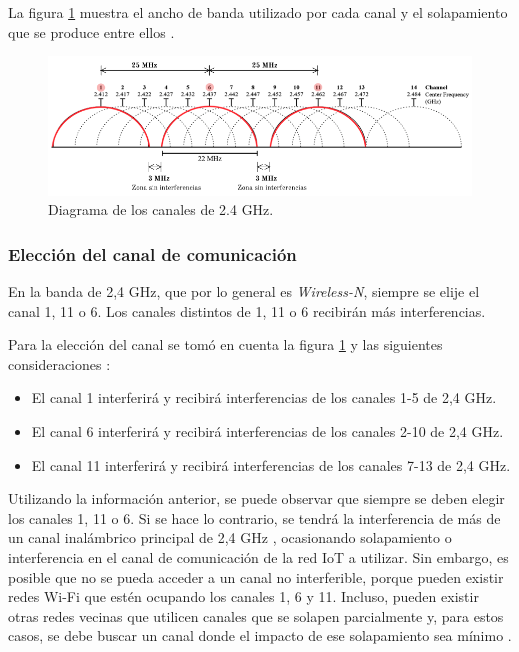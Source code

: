 La figura \ref{fig:canales} muestra el ancho de banda utilizado por cada canal y el solapamiento que se produce entre ellos \citep{WEBSITE:27}.

\begin{figure}[htpb]
\centering 
\includegraphics[width=1.0\textwidth]{./Figures/canales.png}
\caption{Diagrama de los canales de 2.4 GHz.}
\label{fig:canales}
\end{figure}

\subsubsection{Elección del canal de comunicación}
En la banda de 2,4 GHz, que por lo general es \emph{Wireless-N}, siempre se elije el canal 1, 11 o 6. Los canales distintos de 1, 11 o 6 recibirán más interferencias. 

Para la elección del canal se tomó en cuenta la figura  \ref{fig:canales} y las siguientes consideraciones \citep{WEBSITE:28}:

\begin{itemize}
\item El canal 1 interferirá y recibirá interferencias de los canales 1-5 de  2,4 GHz.
\item El canal 6 interferirá y recibirá interferencias de los canales 2-10 de  2,4 GHz.
\item El canal 11 interferirá y recibirá interferencias de los canales 7-13 de 2,4 GHz.
\end{itemize}

Utilizando la información anterior, se puede observar que siempre se deben elegir los canales 1, 11 o 6. Si se hace lo contrario, se tendrá la interferencia de más de un canal inalámbrico principal de 2,4 GHz \citep{WEBSITE:28}, ocasionando solapamiento o interferencia en el canal de comunicación de la red IoT a utilizar. Sin embargo, es posible que no se pueda acceder a un canal no interferible, porque pueden existir redes Wi-Fi que estén ocupando los canales 1, 6 y 11. Incluso, pueden existir otras redes vecinas que utilicen canales que se solapen parcialmente y, para estos casos, se debe buscar un canal donde el impacto de ese solapamiento sea mínimo \citep{WEBSITE:27}.

